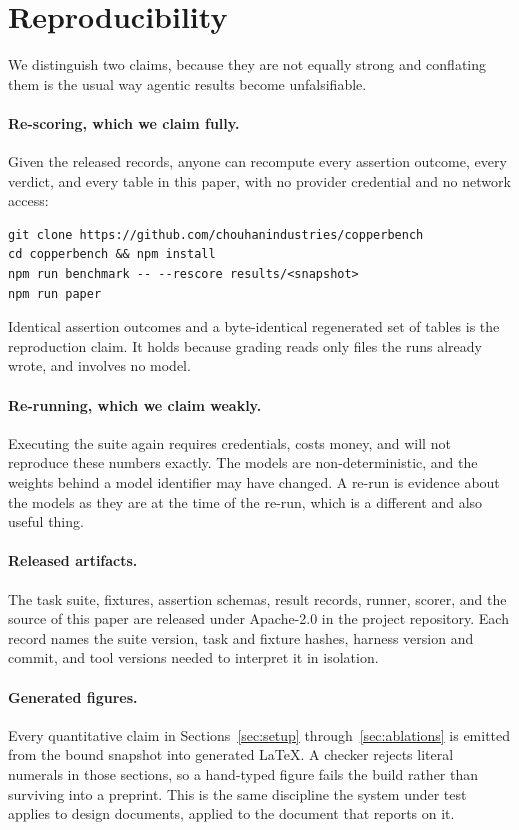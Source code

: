 \section{Reproducibility}
\label{sec:repro}

We distinguish two claims, because they are not equally strong and conflating them is the usual way agentic results become unfalsifiable.

\paragraph{Re-scoring, which we claim fully.} Given the released records, anyone can recompute every assertion outcome, every verdict, and every table in this paper, with no provider credential and no network access:

\begin{verbatim}
git clone https://github.com/chouhanindustries/copperbench
cd copperbench && npm install
npm run benchmark -- --rescore results/<snapshot>
npm run paper
\end{verbatim}

Identical assertion outcomes and a byte-identical regenerated set of tables is the reproduction claim. It holds because grading reads only files the runs already wrote, and involves no model.

\paragraph{Re-running, which we claim weakly.} Executing the suite again requires credentials, costs money, and will not reproduce these numbers exactly. The models are non-deterministic, and the weights behind a model identifier may have changed. A re-run is evidence about the models as they are at the time of the re-run, which is a different and also useful thing.

\paragraph{Released artifacts.} The task suite, fixtures, assertion schemas, result records, runner, scorer, and the source of this paper are released under Apache-2.0 in the project repository. Each record names the suite version, task and fixture hashes, harness version and commit, and tool versions needed to interpret it in isolation.

\paragraph{Generated figures.} Every quantitative claim in Sections~\ref{sec:setup} through~\ref{sec:ablations} is emitted from the bound snapshot into generated LaTeX. A checker rejects literal numerals in those sections, so a hand-typed figure fails the build rather than surviving into a preprint. This is the same discipline the system under test applies to design documents, applied to the document that reports on it.
